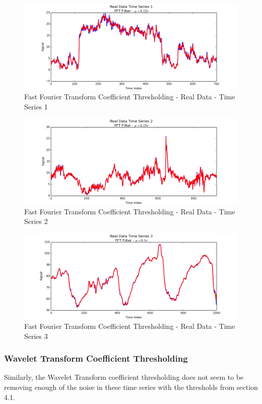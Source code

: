 \documentclass[11pt]{article}
\theoremstyle{definition}
\begin{document}
\begin{figure}
\centering
\includegraphics[width = 0.75 \textwidth]{FFTRealSignal1.png}
\caption{Fast Fourier Transform Coefficient Thresholding - Real Data - Time Series 1}
\label{fftrealsignal1}
\end{figure}

\begin{figure}
\centering
\includegraphics[width = 0.75 \textwidth]{FFTRealSignal2.png}
\caption{Fast Fourier Transform Coefficient Thresholding - Real Data - Time Series 2}
\label{fftrealsignal2}
\end{figure}

\begin{figure}
\centering
\includegraphics[width = 0.75 \textwidth]{FFTRealSignal3.png}
\caption{Fast Fourier Transform Coefficient Thresholding - Real Data - Time Series 3}
\label{fftrealsignal3}
\end{figure}

\newpage

\subsubsection{Wavelet Transform Coefficient Thresholding}

Similarly, the Wavelet Transform coefficient thresholding does not seem to be removing enough of the noise in these time series with the thresholds from section 4.1.
\end{document}
